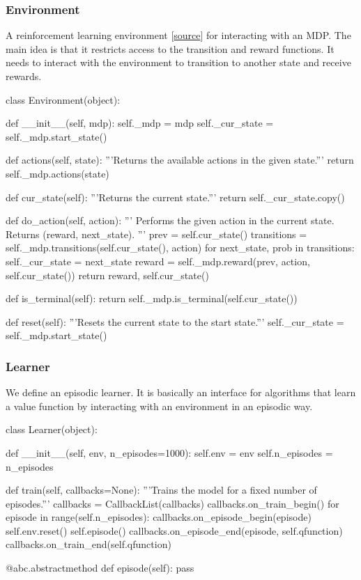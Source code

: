 \documentclass{article}
\newcommand{\GithubURL}[1]{[\href{https://github.com/davidrobles/mlnd-capstone-code/blob/master/#1}{source}]}
\begin{document}
\subsubsection{Environment}

A reinforcement learning environment \GithubURL{capstone/rl/environment.py} for interacting with an
MDP. The main idea is that it restricts access to the transition and reward functions. It needs to
interact with the environment to transition to another state and receive rewards.

\begin{python}
class Environment(object):

    def __init__(self, mdp):
        self._mdp = mdp
        self._cur_state = self._mdp.start_state()

    def actions(self, state):
        '''Returns the available actions in the given state.'''
        return self._mdp.actions(state)

    def cur_state(self):
        '''Returns the current state.'''
        return self._cur_state.copy()

    def do_action(self, action):
        '''
        Performs the given action in the current state.
        Returns (reward, next_state).
        '''
        prev = self.cur_state()
        transitions = self._mdp.transitions(self.cur_state(), action)
        for next_state, prob in transitions:
            self._cur_state = next_state
        reward = self._mdp.reward(prev, action, self.cur_state())
        return reward, self.cur_state()

    def is_terminal(self):
        return self._mdp.is_terminal(self.cur_state())

    def reset(self):
        '''Resets the current state to the start state.'''
        self._cur_state = self._mdp.start_state()
\end{python}

\subsubsection{Learner}

We define an episodic learner. It is basically an interface for algorithms that learn a value
function by interacting with an environment in an episodic way.

\begin{python}
class Learner(object):

    def __init__(self, env, n_episodes=1000):
        self.env = env
        self.n_episodes = n_episodes

    def train(self, callbacks=None):
        '''Trains the model for a fixed number of episodes.'''
        callbacks = CallbackList(callbacks)
        callbacks.on_train_begin()
        for episode in range(self.n_episodes):
            callbacks.on_episode_begin(episode)
            self.env.reset()
            self.episode()
            callbacks.on_episode_end(episode, self.qfunction)
        callbacks.on_train_end(self.qfunction)

    @abc.abstractmethod
    def episode(self):
        pass
\end{python}
\end{document}
